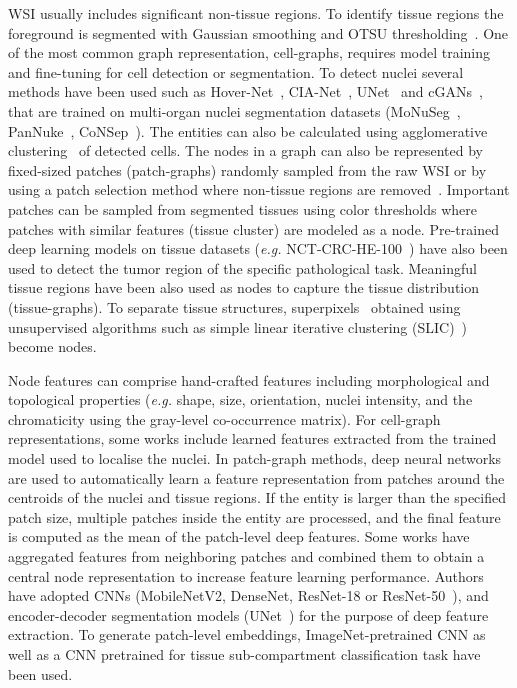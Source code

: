 WSI usually includes significant non-tissue regions. To identify tissue regions the foreground is segmented with Gaussian smoothing and OTSU thresholding{~}.
One of the most common graph representation, cell-graphs, requires model training and fine-tuning for cell detection or segmentation. To detect nuclei several methods have been used such as Hover-Net{~}, CIA-Net{~}, 
UNet{~} and cGANs{~}, that are trained on multi-organ nuclei segmentation datasets (MoNuSeg{~}, PanNuke{~}, CoNSep{~}). The entities can also be calculated using agglomerative clustering{~} of detected cells.
The nodes in a graph can also be represented by fixed-sized patches (patch-graphs) randomly sampled from the raw WSI or by using a patch selection method where non-tissue regions are removed{~}. 
Important patches can be sampled from segmented tissues using color thresholds where patches with similar features (tissue cluster) are modeled as a node.
Pre-trained deep learning models on tissue datasets (\textit{e.g.} NCT-CRC-HE-100{~}) have also been used to detect the tumor region of the specific pathological task.
Meaningful tissue regions have been also used as nodes to capture the tissue distribution (tissue-graphs). To separate tissue structures, superpixels{~} obtained using unsupervised algorithms such as simple linear iterative clustering (SLIC){~}) become nodes.

Node features can comprise hand-crafted features including morphological and topological properties (\textit{e.g.} shape, size, orientation, nuclei intensity, and the chromaticity using the gray-level co-occurrence matrix).
For cell-graph representations, some works include learned features extracted from the trained model used to localise the nuclei.
In patch-graph methods, deep neural networks are used to automatically learn a feature representation from patches around the centroids of the nuclei and tissue regions. If the entity is larger than the specified patch size, multiple patches inside the entity are processed, and the final feature is computed as the mean of the patch-level deep features.
Some works have aggregated features from neighboring patches and combined them to obtain a central node representation to increase feature learning performance.
Authors have adopted CNNs (MobileNetV2, DenseNet, ResNet-18 or ResNet-50{~}), and encoder-decoder segmentation models (UNet{~}) for the purpose of deep feature extraction. To generate patch-level embeddings, ImageNet-pretrained CNN as well as a CNN pretrained for tissue sub-compartment classification task have been used.

